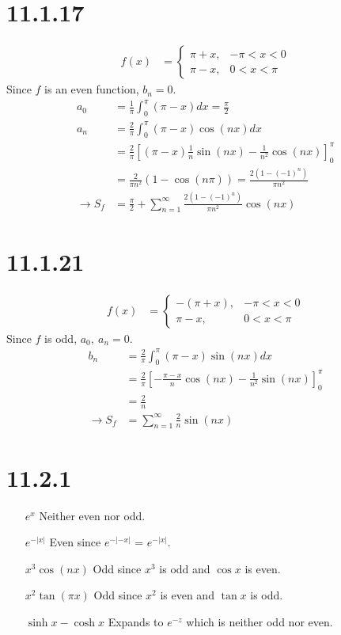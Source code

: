 \documentclass[11pt,a4paper]{article}
\begin{document}
\section*{11.1.17}
\begin{align*}
    f(x) &=
        \left\{\begin{matrix}
        \pi+x, &-\pi<x<0 \\ 
        \pi-x, &0<x<\pi 
        \end{matrix}\right.
\end{align*}
Since $f$ is an even function, $b_n = 0.$
\begin{align*}
    a_0 &= \frac{1}{\pi} \int_0^\pi (\pi-x)dx = \frac{\pi}{2} \\
    a_n &= \frac{2}{\pi} \int_0^\pi (\pi-x)\cos(nx)dx \\
    &= \frac{2}{\pi} \left[
        (\pi-x)\frac{1}{n}\sin(nx) - \frac{1}{n^2}\cos(nx)
    \right]_0^\pi \\
    &= \frac{2}{\pi n^2} (1-\cos(n\pi)) = \frac{2(1-(-1)^n)}{\pi n^2} \\
    \rightarrow S_f 
    &= \frac{\pi}{2} + \sum_{n=1}^\infty \frac{2(1-(-1)^n)}{\pi n^2} \cos(nx)
\end{align*} 

\section*{11.1.21}
\begin{align*}
    f(x) &=
        \left\{\begin{matrix}
        -(\pi+x), &-\pi<x<0 \\ 
        \pi-x, &0<x<\pi 
        \end{matrix}\right.
\end{align*}
Since $f$ is odd, $a_0,\ a_n = 0$.
\begin{align*}
    b_n &= \frac{2}{\pi} \int_0^\pi (\pi-x)\sin(nx)dx \\
    &= \frac{2}{\pi} \left[
        -\frac{\pi-x}{n}\cos(nx) - \frac{1}{n^2}\sin(nx)
    \right]_0^\pi \\
    &= \frac{2}{n} \\
    \rightarrow S_f 
    &= \sum_{n=1}^\infty \frac{2}{n}\sin(nx)
\end{align*}

\section*{11.2.1}
\begin{itemize}[leftmargin=4.0cm,labelsep=0.5cm]
    \item[$e^x$] Neither even nor odd.
    \item[$e^{-|x|}$] Even since $e^{-|-x|}$ = $e^{-|x|}$.
    \item[$x^3\cos(nx)$] Odd since $x^3$ is odd and $\cos x$ is even.
    \item[$x^2\tan(\pi x)$] Odd since $x^2$ is even and $\tan x$ is odd.
    \item[$\sinh x - \cosh x$] Expands to $e^{-z}$ which is neither odd nor even.
\end{itemize}
\end{document}
